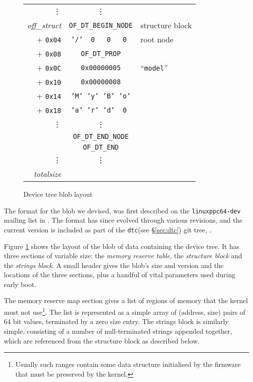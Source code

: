 \documentclass[a4paper,twocolumn]{article}
\newcommand{\dtbeginnode}{\texttt{OF\_DT\_BEGIN\_NODE\xspace}}
\newcommand{\dtendnode}{\texttt{OF\_DT\_END\_NODE\xspace}}
\newcommand{\dtprop}{\texttt{OF\_DT\_PROP\xspace}}
\newcommand{\dtend}{\texttt{OF\_DT\_END\xspace}}
\newcommand{\dtc}{\texttt{dtc}\xspace}
\begin{document}
\begin{figure}[htb!]
\begin{tabular}{r|c|l}
    \multicolumn{1}{r}{\vdots} & \multicolumn{1}{c}{\vdots} & \\\cline{2-2}
    \emph{off\_struct} & \dtbeginnode & structure block \\\cline{2-2}
    + \texttt{0x04} & \texttt{'/' ~0~ ~0~ ~0~}  & root node\\\cline{2-2}
    + \texttt{0x08} & \dtprop & \\\cline{2-2}
    + \texttt{0x0C} & \texttt{0x00000005} & ``\texttt{model}''\\\cline{2-2}
    + \texttt{0x10} & \texttt{0x00000008} & \\\cline{2-2}
    + \texttt{0x14} & \texttt{'M' 'y' 'B' 'o'} & \\
    + \texttt{0x18} & \texttt{'a' 'r' 'd' ~0~} & \\\cline{2-2}
    \vdots & \multicolumn{1}{c|}{\vdots} & \\\cline{2-2}
    & \texttt{\dtendnode} \\\cline{2-2}
    & \texttt{\dtend} \\\cline{2-2}
    \multicolumn{1}{r}{\vdots} & \multicolumn{1}{c}{\vdots} & \\\cline{2-2}    
    \multicolumn{1}{r}{\emph{totalsize}} \\
  \end{tabular}
  \caption{Device tree blob layout}
  \label{fig:blob-layout}
\end{figure}

The format for the blob we devised, was first described on the
\texttt{linuxppc64-dev} mailing list in \cite{noof1}.  The format has
since evolved through various revisions, and the current version is
included as part of the \dtc (see \S\ref{sec:dtc}) git tree,
\cite{dtcgit}.

Figure \ref{fig:blob-layout} shows the layout of the blob of data
containing the device tree.  It has three sections of variable size:
the \emph{memory reserve table}, the \emph{structure block} and the
\emph{strings block}.  A small header gives the blob's size and
version and the locations of the three sections, plus a handful of
vital parameters used during early boot.

The memory reserve map section gives a list of regions of memory that
the kernel must not use\footnote{Usually such ranges contain some data
structure initialised by the firmware that must be preserved by the
kernel.}.  The list is represented as a simple array of (address,
size) pairs of 64 bit values, terminated by a zero size entry.  The
strings block is similarly simple, consisting of a number of
null-terminated strings appended together, which are referenced from
the structure block as described below.
\end{document}
